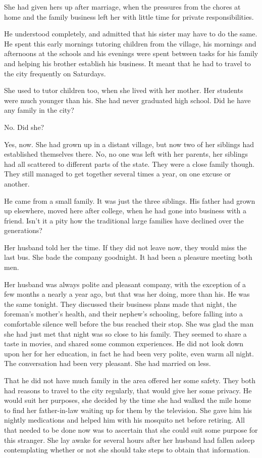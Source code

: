 \documentclass{article}
\begin{document}
She had given hers up after marriage, when the pressures from the chores at home and the family business left her with little time for private responsibilities. 

He understood completely, and admitted that his sister may have to do the same.  He spent this early mornings tutoring children from the village, his mornings and afternoons at the schools and his evenings were spent between tasks for his family and helping his brother establish his business. It meant that he had to travel to the city frequently on Saturdays.

She used to tutor children too, when she lived with her mother. Her students were much younger than his. She had never graduated high school. Did he have any family in the city? 

No. Did she? 

Yes, now. She had grown up in a distant village, but now two of her siblings had established themselves there. No, no one was left with her parents, her siblings had all scattered to different parts of the state. They were a close family though. They still managed to get together several times a year, on one excuse or another. 

He came from a small family. It was just the three siblings. His father had grown up elsewhere, moved here after college, when he had gone into business with a friend. Isn't it a pity how the traditional large families have declined over the generations?

Her husband told her the time. If they did not leave now, they would miss the last bus. She bade the company goodnight. It had been a pleasure meeting both men. 

Her husband was always polite and pleasant company, with the exception of a few months a nearly a year ago, but that was her doing, more than his. He was the same tonight. They discussed their business plans made that night, the foreman's mother's health, and their nephew's schooling, before falling into a comfortable silence well before the bus reached their stop. She was glad the man she had just met that night was so close to his family. They seemed to share a taste in movies, and shared some common experiences. He did not look down upon her for her education, in fact he had been very polite, even warm all night. The conversation had been very pleasant. She had married on less. 

That he did not have much family in the area offered her some safety. They both had reasons to travel to the city regularly, that would give her some privacy. He would suit her purposes, she decided by the time she had walked the mile home to find her father-in-law waiting up for them by the television. She gave him his nightly medications and helped him with his mosquito net before retiring. All that needed to be done now was to ascertain that she could suit some purpose for this stranger. She lay awake for several hours after her husband had fallen asleep contemplating whether or not she should take steps to obtain that information.
\end{document}

